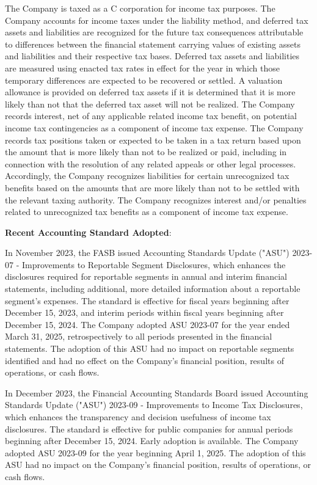 \documentclass[11pt,a4paper]{article}
\begin{document}
The Company is taxed as a C corporation for income tax purposes. The Company accounts for income taxes under the liability method, and deferred tax assets and liabilities are recognized for the future tax consequences attributable to differences between the financial statement carrying values of existing assets and liabilities and their respective tax bases. Deferred tax assets and liabilities are measured using enacted tax rates in effect for the year in which those temporary differences are expected to be recovered or settled. A valuation allowance is provided on deferred tax assets if it is determined that it is more likely than not that the deferred tax asset will not be realized. The Company records interest, net of any applicable related income tax benefit, on potential income tax contingencies as a component of income tax expense. The Company records tax positions taken or expected to be taken in a tax return based upon the amount that is more likely than not to be realized or paid, including in connection with the resolution of any related appeals or other legal processes. Accordingly, the Company recognizes liabilities for certain unrecognized tax benefits based on the amounts that are more likely than not to be settled with the relevant taxing authority. The Company recognizes interest and/or penalties related to unrecognized tax benefits as a component of income tax expense.

\textbf{Recent Accounting Standard Adopted}:

In November 2023, the FASB issued Accounting Standards Update ("ASU") 2023-07 - Improvements to Reportable Segment Disclosures, which enhances the disclosures required for reportable segments in annual and interim financial statements, including additional, more detailed information about a reportable segment's expenses. The standard is effective for fiscal years beginning after December 15, 2023, and interim periods within fiscal years beginning after December 15, 2024. The Company adopted ASU 2023-07 for the year ended March 31, 2025, retrospectively to all periods presented in the financial statements. The adoption of this ASU had no impact on reportable segments identified and had no effect on the Company's financial position, results of operations, or cash flows.

In December 2023, the Financial Accounting Standards Board issued Accounting Standards Update ("ASU") 2023-09 - Improvements to Income Tax Disclosures, which enhances the transparency and decision usefulness of income tax disclosures. The standard is effective for public companies for annual periods beginning after December 15, 2024. Early adoption is available. The Company adopted ASU 2023-09 for the year beginning April 1, 2025. The adoption of this ASU had no impact on the Company's financial position, results of operations, or cash flows.
\end{document}
